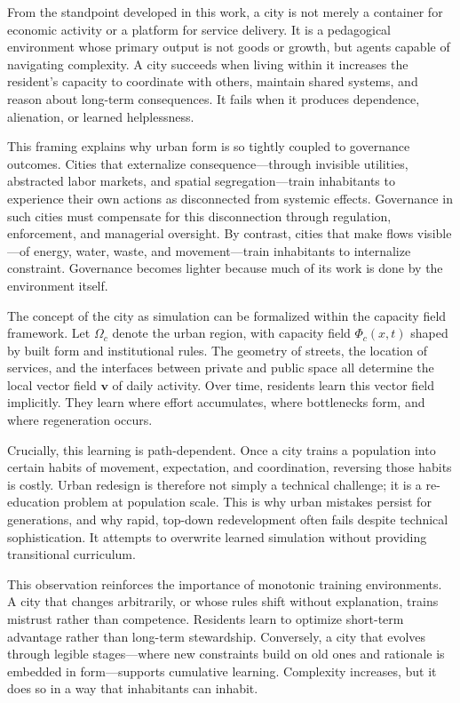 \documentclass[12pt,oneside]{book}
\begin{document}
From the standpoint developed in this work, a city is not merely a container for economic activity or a platform for service delivery. It is a pedagogical environment whose primary output is not goods or growth, but agents capable of navigating complexity. A city succeeds when living within it increases the resident’s capacity to coordinate with others, maintain shared systems, and reason about long-term consequences. It fails when it produces dependence, alienation, or learned helplessness.

This framing explains why urban form is so tightly coupled to governance outcomes. Cities that externalize consequence—through invisible utilities, abstracted labor markets, and spatial segregation—train inhabitants to experience their own actions as disconnected from systemic effects. Governance in such cities must compensate for this disconnection through regulation, enforcement, and managerial oversight. By contrast, cities that make flows visible—of energy, water, waste, and movement—train inhabitants to internalize constraint. Governance becomes lighter because much of its work is done by the environment itself.

The concept of the city as simulation can be formalized within the capacity field framework. Let \(\Omega_c\) denote the urban region, with capacity field \(\Phi_c(x,t)\) shaped by built form and institutional rules. The geometry of streets, the location of services, and the interfaces between private and public space all determine the local vector field \(\mathbf{v}\) of daily activity. Over time, residents learn this vector field implicitly. They learn where effort accumulates, where bottlenecks form, and where regeneration occurs.

Crucially, this learning is path-dependent. Once a city trains a population into certain habits of movement, expectation, and coordination, reversing those habits is costly. Urban redesign is therefore not simply a technical challenge; it is a re-education problem at population scale. This is why urban mistakes persist for generations, and why rapid, top-down redevelopment often fails despite technical sophistication. It attempts to overwrite learned simulation without providing transitional curriculum.

This observation reinforces the importance of monotonic training environments. A city that changes arbitrarily, or whose rules shift without explanation, trains mistrust rather than competence. Residents learn to optimize short-term advantage rather than long-term stewardship. Conversely, a city that evolves through legible stages—where new constraints build on old ones and rationale is embedded in form—supports cumulative learning. Complexity increases, but it does so in a way that inhabitants can inhabit.
\end{document}
